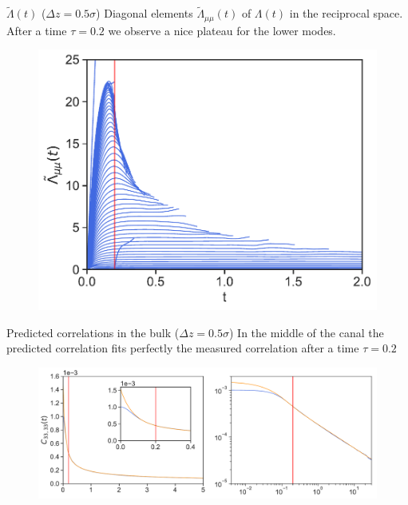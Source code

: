 \documentclass{beamer}
\begin{document}
\begin{frame}{$\tilde{\Lambda}(t)$ ($\Delta z=0.5\sigma$)}
Diagonal elements  $\tilde{\Lambda}_{\mu\mu}(t)$ of $\Lambda(t)$ in the reciprocal space. After a time $\tau=0.2$ we observe a nice plateau for the lower modes. 
\begin{figure}[h!]
\includegraphics[width=0.7\linewidth]{LambdatRec-WALLS-66nodes}
\end{figure}
\end{frame}

\begin{frame}{Predicted correlations in the bulk ($\Delta z=0.5\sigma$)}
  In the middle of the canal the {\color{orange} predicted} correlation fits perfectly the {\color{blue} measured} correlation after a time $\tau=0.2$
\begin{figure}[h!]
\includegraphics[width=\linewidth]{Predictions-canal-WALLS-66nodes-defense}
\end{figure}
\end{frame}
\end{document}
